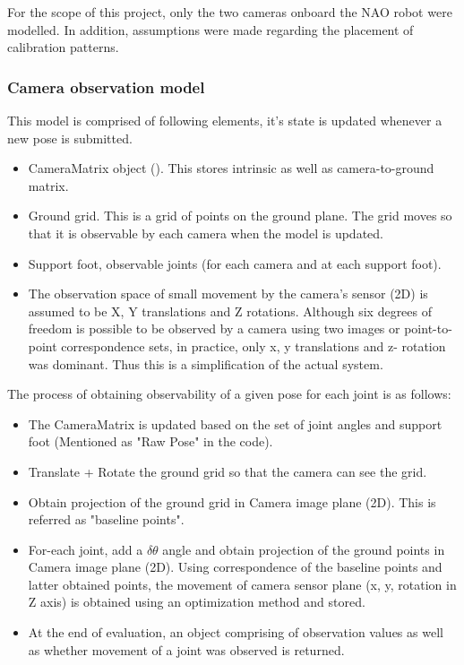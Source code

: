 \documentclass[english, printversion, nomenclature, notitle]{tuvisionthesis} %
\begin{document}
For the scope of this project, only the two cameras onboard the NAO robot were modelled. In addition, assumptions were made regarding the placement of calibration patterns.

\subsubsection{Camera observation model}

This model is comprised of following elements, it's state is updated whenever a new pose is submitted. 
\begin{itemize}
	\item CameraMatrix object ().
	\subitem This stores intrinsic as well as camera-to-ground matrix.
	\item Ground grid. This is a grid of points on the ground plane.
	\subitem The grid moves so that it is observable by each camera when the model is updated.
	\item Support foot, observable joints (for each camera and at each support foot). 
	\item The observation space of small movement by the camera's sensor (2D) is assumed to be X, Y translations and Z rotations.
	\subitem Although six degrees of freedom is possible to be observed by a camera using two images or point-to-point correspondence sets, in practice, only x, y translations and z- rotation was dominant.  Thus this is a simplification of the actual system.
\end{itemize}

The process of obtaining observability of a given pose for each joint is as follows: 
\begin{itemize}
	\item The CameraMatrix is updated based on the set of joint angles and support foot (Mentioned as "Raw Pose" in the code).
	\item Translate + Rotate the ground grid so that the camera can see the grid.
	\item Obtain projection of the ground grid in Camera image plane (2D). This is referred as "baseline points".
	\item For-each joint, add a \(\delta\theta\) angle and obtain projection of the ground points in Camera image plane (2D).
	\subitem Using correspondence of the baseline points and latter obtained points, the movement of camera sensor plane (x, y, rotation in Z axis) is obtained using an optimization method and stored.
	\item At the end of evaluation, an object comprising of observation values as well as whether movement of a joint was observed is returned.
\end{itemize}
\end{document}

